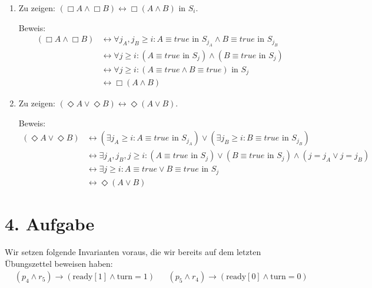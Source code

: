 \documentclass[numbers=noendperiod]{scrartcl}
\begin{document}
\begin{enumerate}
	\item Zu zeigen: $(\Box A \land \Box B) \leftrightarrow \Box( A \land B)$ in $S_i$. 
	
	Beweis: 
	\begin{align}
		(\Box A \land \Box B) &\leftrightarrow \forall j_A,j_B \ge i: A \equiv true \text{ in } S_{j_A} \land B \equiv true \text{ in } S_{j_B}\\
		& \leftrightarrow \forall j \ge i : (A \equiv true \text{ in } S_j) \land (B \equiv true \text{ in } S_j)\\
		& \leftrightarrow \forall j  \ge i : (A \equiv true \land B \equiv true) \text{ in } S_j\\
		& \leftrightarrow \Box (A\land B)
	\end{align}
	
	\item Zu zeigen: $(\Diamond A \lor \Diamond B) \leftrightarrow \Diamond (A \lor B)$.
	
	Beweis:
	\begin{align}
		(\Diamond A \lor \Diamond B) &\leftrightarrow (\exists j_A \ge i : A \equiv true \text{ in } S_{j_A}) \lor (\exists j_B \ge i : B \equiv true \text{ in } S_{j_B})\\
		&\leftrightarrow \exists j_A,j_B,j \ge i: (A \equiv true \text{ in } S_j) \lor (B \equiv true \text{ in } S_j) \land (j = j_A \lor j = j_B)\\
		&\leftrightarrow \exists j \ge i : A \equiv true \lor B \equiv true \text{ in } S_j\\
		&\leftrightarrow \Diamond (A \lor B)
	\end{align}

\end{enumerate}
		
\section*{4. Aufgabe}

Wir setzen folgende Invarianten voraus, die wir bereits auf dem letzten Übungszettel beweisen haben:
\begin{align}
	&(p_4 \land r_5) \rightarrow (\text{ready}[1] \land \text{turn} = 1)
	&&(p_5 \land r_4) \rightarrow (\text{ready}[0] \land \text{turn} = 0)
\end{align}
\end{document}
